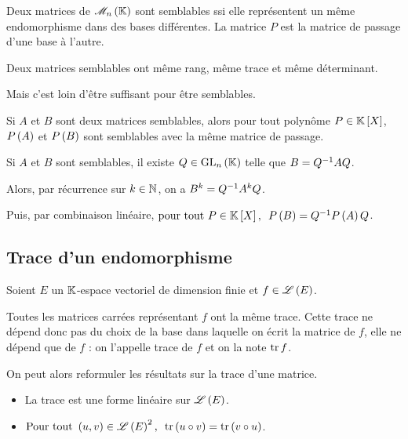 \begin{prop}
Deux matrices de \(\M{n}\) sont semblables ssi elle représentent un même endomorphisme dans des bases différentes. La matrice \(P\) est la matrice de passage d'une base à l'autre.
\end{prop}

\begin{cor}
Deux matrices semblables ont même rang, même trace et même déterminant.
\end{cor}

Mais c'est loin d'être suffisant pour être semblables.

\begin{prop}
Si \(A\) et \(B\) sont deux matrices semblables, alors pour tout polynôme \(P\in\poly\), \(P\left(A\right)\) et \(P\left(B\right)\) sont semblables avec la même matrice de passage.
\end{prop}

\begin{dem}
Si \(A\) et \(B\) sont semblables, il existe \(Q\in\GL{n}\) telle que \(B=Q^{-1} AQ\).

Alors, par récurrence sur \(k\in\mathbb{N}\), on a \(B^k=Q^{-1} A^kQ\).

Puis, par combinaison linéaire, \(\quantifs{\tpt P\in\poly}P\paren{B}=Q\inv P\paren{A}Q\).
\end{dem}

\subsection{Trace d'un endomorphisme}

\begin{prop}
Soient \(E\) un \(\mathbb{K}\)-espace vectoriel de dimension finie et \(f\in\mathscr{L}\left(E\right)\).

Toutes les matrices carrées représentant \(f\) ont la même trace. Cette trace ne dépend donc pas du choix de la base dans laquelle on écrit la matrice de \(f\), elle ne dépend que de \(f\) : on l'appelle trace de \(f\) et on la note \(\operatorname{tr} f\).
\end{prop}

On peut alors reformuler les résultats sur la trace d'une matrice.

\begin{prop}
\begin{itemize}
    \item La trace est une forme linéaire sur \(\mathscr{L}\left(E\right)\). \\
    \item \(\quantifs{\Tpt\paren{u,v}\in\Lendo{E}^2}\tr\paren{u\rond v}=\tr\paren{v\rond u}\).
\end{itemize}
\end{prop}

